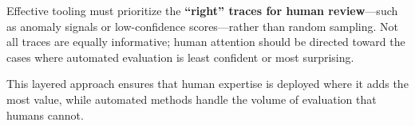 Effective tooling must prioritize the \textbf{``right'' traces for human review}---such as anomaly signals or low-confidence scores---rather than random sampling. Not all traces are equally informative; human attention should be directed toward the cases where automated evaluation is least confident or most surprising.

This layered approach ensures that human expertise is deployed where it adds the most value, while automated methods handle the volume of evaluation that humans cannot.